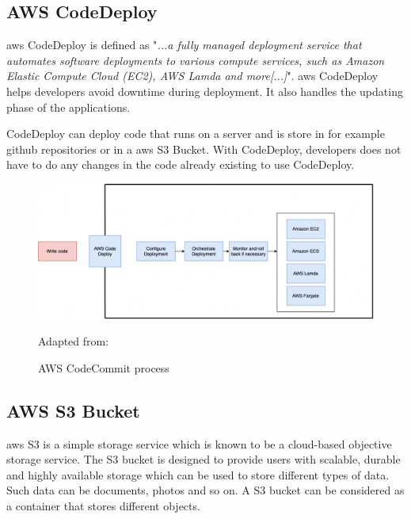 \newpage
\subsection{AWS CodeDeploy}
\acrshort{aws} CodeDeploy is defined as "\textit{...a fully managed deployment service that automates software deployments to various compute services, such as Amazon Elastic Compute Cloud (EC2), AWS Lamda and more[...]}"\cite{AWSCodeDeploy}.
\acrshort{aws} CodeDeploy helps developers avoid downtime during deployment. It also handles the updating phase of the applications. 

CodeDeploy can deploy code that runs on a server and is store in for example github repositories or in a \acrshort{aws} S3 Bucket. With CodeDeploy, developers does not have to do any changes in the code already existing to use CodeDeploy. \cite{CodeDeploy1}

\begin{figure}[htp]
    \centering
    \includegraphics[width=1\columnwidth]{Images/AWSCodeDeploy.png}
    \caption{AWS CodeCommit process} Adapted from: \cite{CodeDeploy1}
    \label{fig:my_label}
\end{figure}

\newpage

\subsection{AWS S3 Bucket}
\acrshort{aws} S3 is a simple storage service which is known to be a cloud-based objective storage service. The S3 bucket is designed to provide users with scalable, durable and highly available storage which can be used to store different types of data. Such data can be documents, photos and so on. 
A S3 bucket can be considered as a container that stores different objects. \cite{S3Bucket}